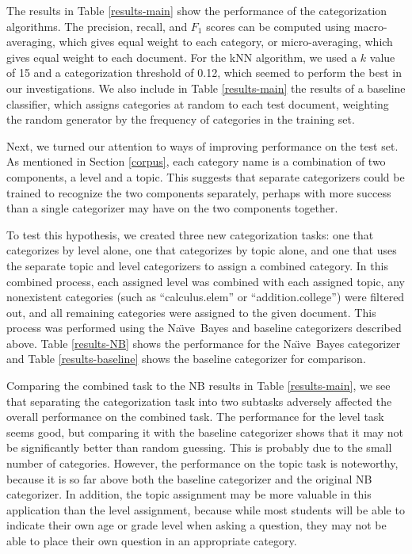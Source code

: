 \documentclass{ios}
\newcommand{\naive}{Na\"\i ve}
\begin{document}
The results in Table \ref{results-main} show the performance of the
categorization algorithms.  The precision, recall, and $F_1$ scores
can be computed using macro-averaging, which gives equal weight to
each category, or micro-averaging, which gives equal weight to each
document. \cite{yang:99, sebastiani:02} For the kNN algorithm, we used
a $k$ value of 15 and a categorization threshold of 0.12, which seemed
to perform the best in our investigations.  We also include in Table
\ref{results-main} the results of a baseline classifier, which assigns categories at
random to each test document, weighting the random generator by the
frequency of categories in the training set.

Next, we turned our attention to ways of improving performance on the
test set.  As mentioned in Section \ref{corpus}, each category name is
a combination of two components, a level and a topic.  This suggests
that separate categorizers could be trained to recognize the two
components separately, perhaps with more success than a single
categorizer may have on the two components together.

To test this hypothesis, we created three new categorization tasks:
one that categorizes by level alone, one that categorizes by topic
alone, and one that uses the separate topic and level categorizers to
assign a combined category.  In this combined process, each assigned
level was combined with each assigned topic, any nonexistent
categories (such as ``calculus.elem'' or ``addition.college'') were
filtered out, and all remaining categories were assigned to the given
document.  This process was performed using the \naive\ Bayes and
baseline categorizers described above.  Table \ref{results-NB} shows
the performance for the \naive\ Bayes categorizer and Table
\ref{results-baseline} shows the baseline categorizer for comparison.

Comparing the combined task to the NB results in Table
\ref{results-main}, we see that separating the categorization task
into two subtasks adversely affected the overall performance on the combined task.
The performance for the level task seems good, but comparing it with the baseline
categorizer shows that it may not be significantly better than random
guessing.  This is probably due to the small number of categories.
However, the performance on the topic task is noteworthy,
because it is so far above both the baseline categorizer and the
original NB categorizer.  In addition, the topic assignment may be
more valuable in this application than the level assignment, because while most students
will be able to indicate their own age or grade level when asking a
question, they may not be able to place their own question in an
appropriate category.
\end{document}
